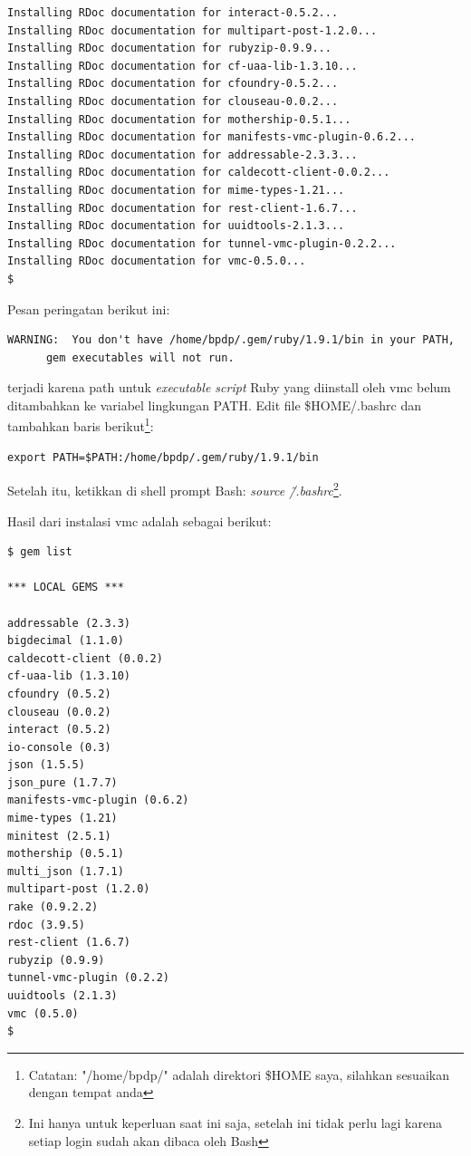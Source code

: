 \begin{lstlisting}
Installing RDoc documentation for interact-0.5.2...
Installing RDoc documentation for multipart-post-1.2.0...
Installing RDoc documentation for rubyzip-0.9.9...
Installing RDoc documentation for cf-uaa-lib-1.3.10...
Installing RDoc documentation for cfoundry-0.5.2...
Installing RDoc documentation for clouseau-0.0.2...
Installing RDoc documentation for mothership-0.5.1...
Installing RDoc documentation for manifests-vmc-plugin-0.6.2...
Installing RDoc documentation for addressable-2.3.3...
Installing RDoc documentation for caldecott-client-0.0.2...
Installing RDoc documentation for mime-types-1.21...
Installing RDoc documentation for rest-client-1.6.7...
Installing RDoc documentation for uuidtools-2.1.3...
Installing RDoc documentation for tunnel-vmc-plugin-0.2.2...
Installing RDoc documentation for vmc-0.5.0...
$
\end{lstlisting}

Pesan peringatan berikut ini:

\lstset{language=bash,caption=Peringatan setting PATH untuk vmc}
\begin{lstlisting}
WARNING:  You don't have /home/bpdp/.gem/ruby/1.9.1/bin in your PATH,
	  gem executables will not run.
\end{lstlisting}

terjadi karena path untuk \textit{executable script} Ruby yang diinstall oleh vmc belum ditambahkan ke variabel lingkungan PATH. Edit file \$HOME/.bashrc dan tambahkan baris berikut\footnote{Catatan: "/home/bpdp/" adalah direktori \$HOME saya, silahkan sesuaikan dengan tempat anda}:
\lstset{language=bash,caption=Peringatan setting PATH untuk vmc}
\begin{lstlisting}
export PATH=$PATH:/home/bpdp/.gem/ruby/1.9.1/bin
\end{lstlisting}

Setelah itu, ketikkan di shell prompt Bash: \textit{source \~/.bashrc}\footnote{Ini hanya untuk keperluan saat ini saja, setelah ini tidak perlu lagi karena setiap login sudah akan dibaca oleh Bash}.

Hasil dari instalasi vmc adalah sebagai berikut:

\lstset{language=bash,caption=Hasil gem yang terinstall}
\begin{lstlisting}
$ gem list 

*** LOCAL GEMS ***

addressable (2.3.3)
bigdecimal (1.1.0)
caldecott-client (0.0.2)
cf-uaa-lib (1.3.10)
cfoundry (0.5.2)
clouseau (0.0.2)
interact (0.5.2)
io-console (0.3)
json (1.5.5)
json_pure (1.7.7)
manifests-vmc-plugin (0.6.2)
mime-types (1.21)
minitest (2.5.1)
mothership (0.5.1)
multi_json (1.7.1)
multipart-post (1.2.0)
rake (0.9.2.2)
rdoc (3.9.5)
rest-client (1.6.7)
rubyzip (0.9.9)
tunnel-vmc-plugin (0.2.2)
uuidtools (2.1.3)
vmc (0.5.0)
$ 
\end{lstlisting}

